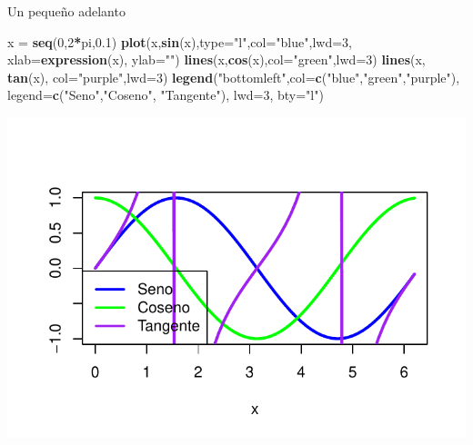 \documentclass[
  ignorenonframetext,
]{beamer}
\newenvironment{Shaded}{\begin{snugshade}}{\end{snugshade}}
\newcommand{\DataTypeTok}[1]{\textcolor[rgb]{0.13,0.29,0.53}{#1}}
\newcommand{\DecValTok}[1]{\textcolor[rgb]{0.00,0.00,0.81}{#1}}
\newcommand{\FloatTok}[1]{\textcolor[rgb]{0.00,0.00,0.81}{#1}}
\newcommand{\KeywordTok}[1]{\textcolor[rgb]{0.13,0.29,0.53}{\textbf{#1}}}
\newcommand{\NormalTok}[1]{#1}
\newcommand{\OperatorTok}[1]{\textcolor[rgb]{0.81,0.36,0.00}{\textbf{#1}}}
\newcommand{\StringTok}[1]{\textcolor[rgb]{0.31,0.60,0.02}{#1}}
\begin{document}
\begin{frame}[fragile]{Un pequeño adelanto}
\protect\hypertarget{un-pequeuxf1o-adelanto}{}

\begin{Shaded}
\begin{Highlighting}[]
\NormalTok{x =}\StringTok{ }\KeywordTok{seq}\NormalTok{(}\DecValTok{0}\NormalTok{,}\DecValTok{2}\OperatorTok{*}\NormalTok{pi,}\FloatTok{0.1}\NormalTok{)}
\KeywordTok{plot}\NormalTok{(x,}\KeywordTok{sin}\NormalTok{(x),}\DataTypeTok{type=}\StringTok{"l"}\NormalTok{,}\DataTypeTok{col=}\StringTok{"blue"}\NormalTok{,}\DataTypeTok{lwd=}\DecValTok{3}\NormalTok{, }\DataTypeTok{xlab=}\KeywordTok{expression}\NormalTok{(x), }\DataTypeTok{ylab=}\StringTok{""}\NormalTok{)}
\KeywordTok{lines}\NormalTok{(x,}\KeywordTok{cos}\NormalTok{(x),}\DataTypeTok{col=}\StringTok{"green"}\NormalTok{,}\DataTypeTok{lwd=}\DecValTok{3}\NormalTok{)}
\KeywordTok{lines}\NormalTok{(x, }\KeywordTok{tan}\NormalTok{(x), }\DataTypeTok{col=}\StringTok{"purple"}\NormalTok{,}\DataTypeTok{lwd=}\DecValTok{3}\NormalTok{)}
\KeywordTok{legend}\NormalTok{(}\StringTok{"bottomleft"}\NormalTok{,}\DataTypeTok{col=}\KeywordTok{c}\NormalTok{(}\StringTok{"blue"}\NormalTok{,}\StringTok{"green"}\NormalTok{,}\StringTok{"purple"}\NormalTok{),}
     \DataTypeTok{legend=}\KeywordTok{c}\NormalTok{(}\StringTok{"Seno"}\NormalTok{,}\StringTok{"Coseno"}\NormalTok{, }\StringTok{"Tangente"}\NormalTok{), }\DataTypeTok{lwd=}\DecValTok{3}\NormalTok{, }\DataTypeTok{bty=}\StringTok{"l"}\NormalTok{)}
\end{Highlighting}
\end{Shaded}

\begin{center}\includegraphics{Tema1_files/figure-beamer/unnamed-chunk-5-1} \end{center}

\end{frame}
\end{document}
